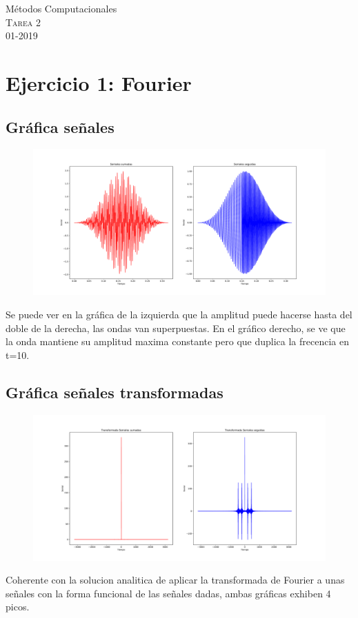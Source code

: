 \documentclass[11pt,letterpaper]{exam}
\begin{document}
\begin{center}
{\Large Métodos Computacionales} \\
\textsc{Tarea 2}\\
01-2019\\
\end{center}

\noindent
\section{Ejercicio 1: Fourier}
\subsection{Gráfica señales}
\begin{figure}[H]
\centering
\includegraphics[scale=0.35]{PlotFourier1.pdf}
\end{figure}

Se puede ver en la gráfica de la izquierda que la amplitud puede hacerse hasta del doble de la derecha, las ondas van superpuestas. En el gráfico derecho, se ve que la onda mantiene su amplitud maxima constante pero que duplica la frecencia en t=10.

\subsection{Gráfica señales transformadas}
\begin{figure}[H]
\centering
\includegraphics[scale=0.35]{PlotTransFourier2.pdf}
\end{figure}
Coherente con la solucion analitica de aplicar la transformada de Fourier a unas señales con la forma funcional de las señales dadas, ambas gráficas exhiben 4 picos.  
\end{document}
